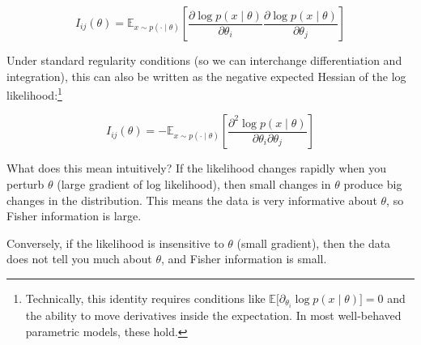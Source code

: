 \begin{equation}
I_{ij}(\theta) = \mathbb{E}_{x \sim p(\cdot \mid \theta)}\left[\frac{\partial \log p(x \mid \theta)}{\partial \theta_i} \frac{\partial \log p(x \mid \theta)}{\partial \theta_j}\right]
\end{equation}

Under standard regularity conditions (so we can interchange differentiation and integration), this can also be written as the negative expected Hessian of the log likelihood:\footnote{Technically, this identity requires conditions like $\mathbb{E}\big[\partial_{\theta_i}\log p(x\mid\theta)\big]=0$ and the ability to move derivatives inside the expectation. In most well-behaved parametric models, these hold.}

\begin{equation}
I_{ij}(\theta) = -\mathbb{E}_{x \sim p(\cdot \mid \theta)}\left[\frac{\partial^2 \log p(x \mid \theta)}{\partial \theta_i \partial \theta_j}\right]
\end{equation}

\vspace{1em}

What does this mean intuitively? If the likelihood changes rapidly when you perturb $\theta$ (large gradient of log likelihood), then small changes in $\theta$ produce big changes in the distribution. This means the data is very informative about $\theta$, so Fisher information is large.

Conversely, if the likelihood is insensitive to $\theta$ (small gradient), then the data does not tell you much about $\theta$, and Fisher information is small.

\vspace{1.5em}

